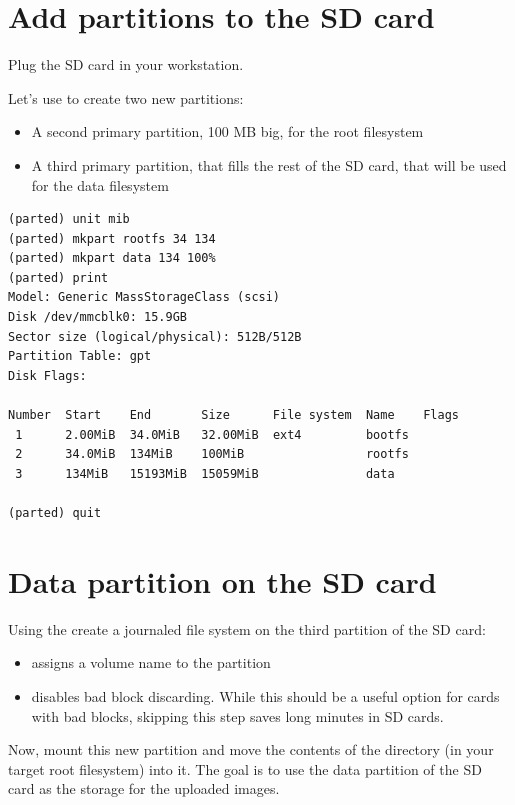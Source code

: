 \section{Add partitions to the SD card}

Plug the SD card in your workstation.

Let's use  to create two new partitions:
\begin{itemize}
\item A second primary partition, 100 MB big, for the root filesystem
\item A third primary partition, that fills the rest of the SD card, that will be
  used for the data filesystem
\end{itemize}

\begin{verbatim}
(parted) unit mib
(parted) mkpart rootfs 34 134
(parted) mkpart data 134 100%
(parted) print
Model: Generic MassStorageClass (scsi)
Disk /dev/mmcblk0: 15.9GB
Sector size (logical/physical): 512B/512B
Partition Table: gpt
Disk Flags:

Number  Start    End       Size      File system  Name    Flags
 1      2.00MiB  34.0MiB   32.00MiB  ext4         bootfs
 2      34.0MiB  134MiB    100MiB                 rootfs
 3      134MiB   15193MiB  15059MiB               data

(parted) quit
\end{verbatim}

\section{Data partition on the SD card}

Using the  create a journaled file system on the
third partition of the SD card:


\begin{itemize}
\item {} assigns a volume name to the partition
\item {} disables bad block discarding. While this
      should be a useful option for cards with bad blocks, skipping
      this step saves long minutes in SD cards.
\end{itemize}

Now, mount this new partition and move the contents of the
 directory (in your target root filesystem) into
it. The goal is to use the data partition of the SD card as the storage
for the uploaded images.

